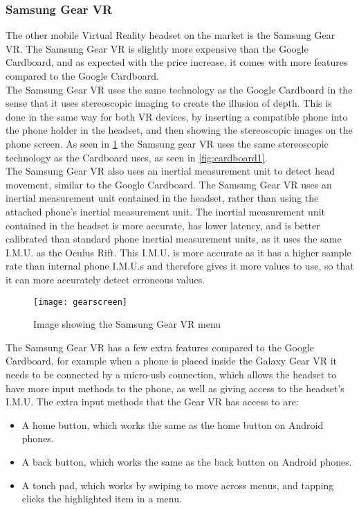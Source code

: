 \subsubsection{Samsung Gear VR}
The other mobile Virtual Reality headset on the market is the Samsung Gear VR. The Samsung Gear VR is slightly more expensive than the Google Cardboard, and as expected with the price increase, it comes with more features compared to the Google Cardboard.\\
	The Samsung Gear VR uses the same technology as the Google Cardboard in the sense that it uses stereoscopic imaging to create the illusion of depth. This is done in the same way for both VR devices, by inserting a compatible phone into the phone holder in the headset, and then showing the stereoscopic images on the phone screen. As seen in \ref{fig:gearscreen} the Samsung gear VR uses the same stereoscopic technology as the Cardboard uses, as seen in \ref{fig:cardboard1}.\\
	The Samsung Gear VR also uses an inertial measurement unit to detect head movement, similar to the Google Cardboard. The Samsung Gear VR uses an inertial measurement unit contained in the headset, rather than using the attached phone's inertial measurement unit. The inertial measurement unit contained in the headset is more accurate, has lower latency, and is better calibrated than standard phone inertial measurement units, as it uses the same I.M.U. as the Oculus Rift. This I.M.U. is more accurate as it has a higher sample rate than internal phone I.M.U.s and therefore gives it more values to use, so that it can more accurately detect erroneous values.

\begin{figure}[H]
	\texttt{[image: gearscreen]}
	\centering
	\caption{Image showing the Samsung Gear VR menu}
	\label{fig:gearscreen}
\end{figure}

	The Samsung Gear VR has a few extra features compared to the Google Cardboard, for example when a phone is placed inside the Galaxy Gear VR it needs to be connected by a micro-usb connection, which allows the headset to have more input methods to the phone, as well as giving access to the headset's I.M.U. The extra input methods that the Gear VR has access to are:\\

\begin{itemize}
	\item A home button, which works the same as the home button on Android phones.
	\item A back button, which works the same as the back button on Android phones.
	\item A touch pad, which works by swiping to move across menus, and tapping clicks the highlighted item in a menu.
\end{itemize}

